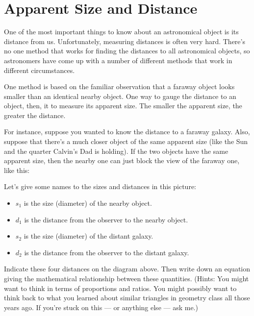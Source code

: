 \chapter{Apparent Size and Distance}

\centerline{\epsfxsize 3in}


One of the most important things to know about an astronomical
object is its distance from us.  Unfortunately, measuring distances
is often very hard.  There's no one method that works for
finding the distances to all astronomical objects, so 
astronomers have come up with a number of different
methods that work in different circumstances.

One method is based on the familiar observation that a 
faraway object looks smaller than an identical nearby object.
One way to gauge the distance to an object, then, it to measure
its apparent size.  The smaller the apparent size, the greater
the distance.

For instance, suppose you wanted to know the distance to a faraway
galaxy.  Also, suppose that there's a much closer object of the
same apparent size (like the Sun and the quarter Calvin's Dad is holding).
If the two objects have the same apparent size, then the nearby one
can just block the view of the faraway one, like this:

\centerline{\epsfxsize 6in}

Let's give some names to the sizes and distances in this picture:
\begin{itemize}
\item $s_1$ is the size (diameter) of the nearby object.
\item $d_1$ is the distance from the observer to the nearby object.
\item $s_2$ is the size (diameter) of the distant galaxy.
\item $d_2$ is the distance from the observer to the distant galaxy.
\end{itemize}

Indicate these four distances on the diagram above.  Then write down 
an equation giving the mathematical relationship between these
quantities.  (Hints: You might want to think in terms of 
proportions and ratios.  You might possibly want to think back to 
what you learned about similar triangles in geometry class all those years ago.
If you're stuck on this --- or anything else --- ask me.)

\vskip 1in

